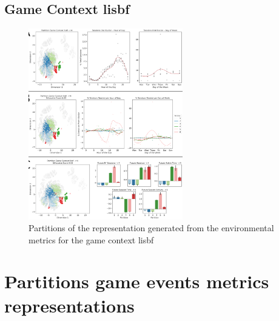 \subsection{Game Context lisbf}
\label{env_clust_lisbf}

\begin{figure}[!htb]
\includegraphics[width=0.6\textwidth]{images/appendix_D/clust_env_lisbf.png}
\centering
\caption[Partitions of the representation generated from the environmental metrics for the game context lisbf]{Partitions of the representation generated from the environmental metrics for the game context lisbf}
\end{figure}
\FloatBarrier

\section{Partitions game events metrics representations}
\label{partitions_game_events}